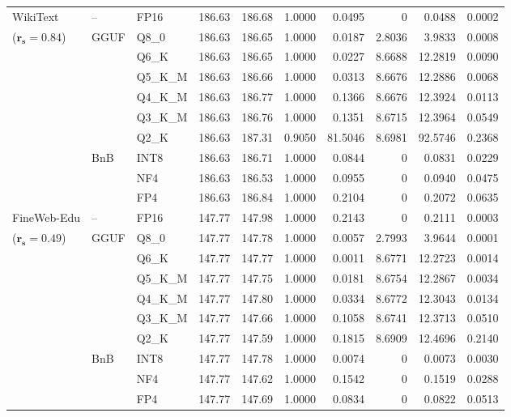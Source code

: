 \begin{longtable}{ll l rrrrrrr}
\midrule
WikiText & -- & FP16 & 186.63 & 186.68 & 1.0000 & 0.0495 & \cellcolor{cyan!12} $0$ & 0.0488 & 0.0002 \\
{\small ($\mathbf{r_s{=}0.84}$)} & GGUF & Q8\_0 & 186.63 & 186.65 & 1.0000 & 0.0187 & 2.8036 & 3.9833 & 0.0008 \\
 &  & Q6\_K & 186.63 & 186.65 & 1.0000 & 0.0227 & 8.6688 & 12.2819 & 0.0090 \\
 &  & Q5\_K\_M & 186.63 & 186.66 & 1.0000 & 0.0313 & 8.6676 & 12.2886 & 0.0068 \\
 &  & Q4\_K\_M & 186.63 & 186.77 & 1.0000 & 0.1366 & 8.6676 & 12.3924 & 0.0113 \\
 &  & Q3\_K\_M & 186.63 & 186.76 & 1.0000 & 0.1351 & 8.6715 & 12.3964 & 0.0549 \\
 &  & Q2\_K & 186.63 & 187.31 & \cellcolor{red!18} 0.9050 & \cellcolor{red!18} 81.5046 & 8.6981 & \cellcolor{red!18} 92.5746 & \cellcolor{red!18} 0.2368 \\
 & BnB & INT8 & 186.63 & 186.71 & 1.0000 & 0.0844 & \cellcolor{cyan!12} $0$ & 0.0831 & 0.0229 \\
 &  & NF4 & 186.63 & 186.53 & 1.0000 & 0.0955 & \cellcolor{cyan!12} $0$ & 0.0940 & 0.0475 \\
 &  & FP4 & 186.63 & 186.84 & 1.0000 & 0.2104 & \cellcolor{cyan!12} $0$ & 0.2072 & 0.0635 \\
\midrule
FineWeb-Edu & -- & FP16 & 147.77 & 147.98 & 1.0000 & 0.2143 & \cellcolor{cyan!12} $0$ & 0.2111 & 0.0003 \\
{\small ($\mathbf{r_s{=}0.49}$)} & GGUF & Q8\_0 & 147.77 & 147.78 & 1.0000 & 0.0057 & 2.7993 & 3.9644 & 0.0001 \\
 &  & Q6\_K & 147.77 & 147.77 & 1.0000 & 0.0011 & 8.6771 & 12.2723 & 0.0014 \\
 &  & Q5\_K\_M & 147.77 & 147.75 & 1.0000 & 0.0181 & 8.6754 & 12.2867 & 0.0034 \\
 &  & Q4\_K\_M & 147.77 & 147.80 & 1.0000 & 0.0334 & 8.6772 & 12.3043 & 0.0134 \\
 &  & Q3\_K\_M & 147.77 & 147.66 & 1.0000 & 0.1058 & 8.6741 & 12.3713 & 0.0510 \\
 &  & Q2\_K & 147.77 & 147.59 & 1.0000 & 0.1815 & 8.6909 & 12.4696 & 0.2140 \\
 & BnB & INT8 & 147.77 & 147.78 & 1.0000 & 0.0074 & \cellcolor{cyan!12} $0$ & 0.0073 & 0.0030 \\
 &  & NF4 & 147.77 & 147.62 & 1.0000 & 0.1542 & \cellcolor{cyan!12} $0$ & 0.1519 & 0.0288 \\
 &  & FP4 & 147.77 & 147.69 & 1.0000 & 0.0834 & \cellcolor{cyan!12} $0$ & 0.0822 & 0.0513 \\
\end{longtable}
\endgroup